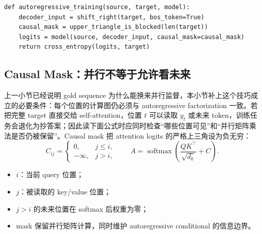 


\begin{lstlisting}[caption={Teacher forcing 与 causal mask 的概念性训练步骤。}]
def autoregressive_training(source, target, model):
    decoder_input = shift_right(target, bos_token=True)
    causal_mask = upper_triangle_is_blocked(len(target))
    logits = model(source, decoder_input, causal_mask=causal_mask)
    return cross_entropy(logits, target)
\end{lstlisting}

\subsection{Causal Mask：并行不等于允许看未来}

上一小节已经说明 gold sequence 为什么能换来并行监督，本小节补上这个技巧成立的必要条件：每个位置的计算图仍必须与 autoregressive factorization 一致。若把完整 target 直接交给 self-attention，位置 $t$ 可以读取 $y_t$ 或未来 token，训练任务会退化为抄答案；因此读下面公式时应同时检查“哪些位置可见”和“并行矩阵乘法是否仍被保留”。Causal mask 把 attention logits 的严格上三角设为负无穷：
\[
C_{ij}=\begin{cases}
0, & j\le i,\\
-\infty, & j>i,
\end{cases}
\qquad
A=\operatorname{softmax}\!\left(\frac{QK^{\top}}{\sqrt{d_k}}+C\right).
\]

\begin{itemize}
  \item $i$：当前 query 位置；
  \item $j$：被读取的 key/value 位置；
  \item $j>i$ 的未来位置在 softmax 后权重为零；
  \item mask 保留并行矩阵计算，同时维护 autoregressive conditional 的信息边界。
\end{itemize}

